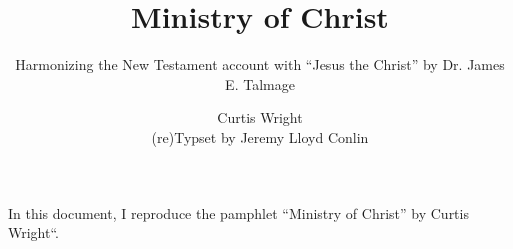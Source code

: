 \documentclass{scrartcl}
\title{Ministry of Christ}
\subtitle{Harmonizing the New Testament account with ``Jesus the Christ'' by Dr. James E. Talmage}
\author{Curtis Wright\\\small (re)Typset by Jeremy Lloyd Conlin}
\begin{document}
\maketitle
In this document, I reproduce the pamphlet ``Ministry of Christ'' by Curtis Wright``.

\end{document}

